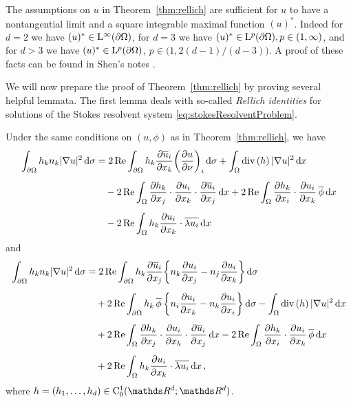 \begin{rem}
  \label{rem:shenNontangential}
  The assumptions on $u$ in Theorem~\ref{thm:rellich} are sufficient for $u$ to have a nontangential limit and a square integrable maximal function $(u)^*$. 
  Indeed for $d = 2$ we have $(u)^* \in \mathrm{L}^\infty(\partial\Omega)$, for $d = 3$ we have $(u)^* \in \mathrm{L}^p(\partial\Omega), p \in (1,\infty)$, and for $d > 3$ we have $(u)^* \in \mathrm{L}^p(\partial\Omega)$, $p \in \big(1, 2 (d - 1) / (d - 3) \big)$.
  A proof of these facts can be found in Shen's notes \cite[Prop.\@~7.1.3 and Rem.\@~7.1.4]{Shen2017}.
\end{rem}

We will now prepare the proof of Theorem~\ref{thm:rellich} by proving several helpful lemmata.
The first lemma deals with so-called \emph{Rellich identities} for solutions of the Stokes resolvent system \eqref{eq:stokesResolventProblem}.

\begin{lem}
  \label{lem:rellichIdentity}
  Under the same conditions on $(u,\phi)$ as in Theorem~\ref{thm:rellich}, we have
  \begin{align}
    \int_{\partial\Omega} h_k n_k |\nabla u|^2 \, {\operatorname{d}\!{\sigma}} 
    &= 2 \operatorname{Re} \int_{\partial\Omega} h_k \frac{\partial \overline u_i}{\partial x_k} \bigg( \frac{\partial u}{\partial \nu} \bigg)_i \, {\operatorname{d}\!{\sigma}} + \int_\Omega \mathrm{div\,} (h)\, |\nabla u|^2 \, {\operatorname{d}\!{x}} \nonumber\\[0.5em]
    &\quad - 2 \operatorname{Re} \int_\Omega \frac{\partial h_k}{\partial x_j} \cdot \frac{\partial u_i}{\partial x_k} \cdot \frac{\partial \overline u_i}{\partial x_j} \, {\operatorname{d}\!{x}} + 2 \operatorname{Re} \int_\Omega \frac{\partial h_k}{\partial x_i} \cdot \frac{\partial u_i}{\partial x_k} \, \overline \phi \, {\operatorname{d}\!{x}} \nonumber\\[0.5em]
    &\quad - 2 \operatorname{Re} \int_\Omega h_k \frac{\partial u_i}{\partial x_k} \cdot \overline {\lambda u_i} \, {\operatorname{d}\!{x}} \label{eq:rellichIdentity}
  \end{align}
  and
  \begin{align}
    \int_{\partial\Omega} h_k n_k |\nabla u|^2 \, {\operatorname{d}\!{\sigma}}
    &= 2\operatorname{Re} \int_{\partial\Omega} h_k \frac{\partial \overline u_i}{\partial x_j} \bigg\{ n_k \frac{\partial u_i}{\partial x_j} - n_j \frac{\partial u_i}{\partial x_k} \bigg\} \, {\operatorname{d}\!{\sigma}} \nonumber\\[0.5em]
    &\quad + 2 \operatorname{Re} \int_{\partial\Omega} h_k \, \overline \phi \, \bigg\{ n_i \frac{\partial u_i}{\partial x_k} - n_k \frac{\partial u_i}{\partial x_i} \bigg\} \, {\operatorname{d}\!{\sigma}} - \int_\Omega \mathrm{div\,} (h)\, |\nabla u|^2 \, {\operatorname{d}\!{x}} \nonumber\\[0.5em]
    &\quad + 2 \operatorname{Re} \int_\Omega \frac{\partial h_k}{\partial x_j} \cdot \frac{\partial u_i}{\partial x_k} \cdot \frac{\partial \overline u_i}{\partial x_j} \, {\operatorname{d}\!{x}} - 2 \operatorname{Re} \int_\Omega \frac{\partial h_k}{\partial x_i} \cdot \frac{\partial u_i}{\partial x_k} \, \overline \phi \, {\operatorname{d}\!{x}} \nonumber\\[0.5em]
    &\quad + 2 \operatorname{Re} \int_\Omega h_k \frac{\partial u_i}{\partial x_k} \cdot \overline{ \lambda u_i} \, {\operatorname{d}\!{x}}\,, \label{eq:rellichIdentity2}
  \end{align}
  where $h = (h_1, \dots,h_d) \in \CC_0^1(\R^d; \R^d)$.
\end{lem}

